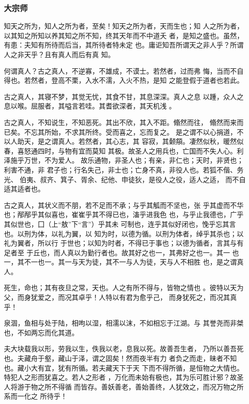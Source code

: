 \documentclass[]{article}
\begin{document}
\hypertarget{header-n641}{%
\subsubsection{大宗师}\label{header-n641}}

知天之所为，知人之所为者，至矣！知天之所为者，天而生也；知
人之所为者，以其知之所知以养其知之所不知，终其天年而不中道夭
者，是知之盛也。虽然，有患：夫知有所待而后当，其所待者特未定
也。庸讵知吾所谓天之非人乎？所谓人之非天乎？且有真人而后有真 知。

何谓真人？古之真人，不逆寡，不雄成，不谟士。若然者，过而弗
悔，当而不自得也。若然者，登高不栗，入水不濡，入火不热，是知
之能登假于道者也若此。

古之真人，其寝不梦，其觉无忧，其食不甘，其息深深。真人之息
以踵，众人之息以喉。屈服者，其嗌言若哇。其耆欲深者，其天机浅 。

古之真人，不知说生，不知恶死。其出不欣，其入不距。翛然而往，
翛然而来而已矣。不忘其所始，不求其所终。受而喜之，忘而复之。
是之谓不以心捐道，不以人助天，是之谓真人。若然者，其心志，其
容寂，其颡頯。凄然似秋，暖然似春，喜怒通四时，与物有宜而莫知
其极。故圣人之用兵也，亡国而不失人心。利泽施乎万世，不为爱人。
故乐通物，非圣人也；有亲，非仁也；天时，非贤也；利害不通，非
君子也；行名失己，非士也；亡身不真，非役人也。若狐不偕、务光、
伯夷、叔齐、箕子、胥余、纪他、申徒狄，是役人之役，适人之适，
而不自适其适者也。

古之真人，其状义而不朋，若不足而不承；与乎其觚而不坚也，张
乎其虚而不华也；邴邴乎其似喜也，崔崔乎其不得已也，滀乎进我色
也，与乎止我德也，广乎其似世也，囗（上``敖''下``言''）乎其未
可制也，连乎其似好闭也，悗乎忘其言也。以刑为体，以礼为翼，以
知为时，以德为循。以刑为体者，绰乎其杀也；以礼为翼者，所以行
于世也；以知为时者，不得已于事也；以德为循者，言其与有足者至
于丘也，而人真以为勤行者也。故其好之也一，其弗好之也一。其一
也一，其不一也一。其一与天为徒，其不一与人为徒，天与人不相胜
也，是之谓真人。

死生，命也；其有夜旦之常，天也。人之有所不得与，皆物之情也
。彼特以天为父，而身犹爱之，而况其卓乎！人特以有君为愈乎己，
而身犹死之，而况其真乎！

泉涸，鱼相与处于陆，相呴以湿，相濡以沫，不如相忘于江湖。与
其誉尧而非桀也，不如两忘而化其道。

夫大块载我以形，劳我以生，佚我以老，息我以死。故善吾生者，
乃所以善吾死也。夫藏舟于壑，藏山于泽，谓之固矣！然而夜半有力
者负之而走，昧者不知也。藏小大有宜，犹有所循。若夫藏天下于天
下而不得所循，是恒物之大情也。特犯人之形而犹喜之。若人之形者
，万化而未始有极也，其为乐可胜计邪？故圣人将游于物之所不得循
而皆存。善妖善老，善始善终，人犹效之，而况万物之所系而一化之 所待乎！
\end{document}
